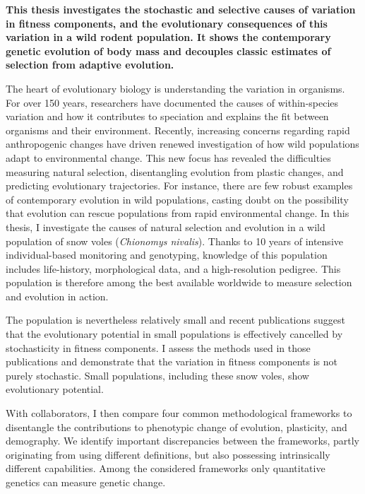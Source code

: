 \begin{summary}
\textbf{
This thesis investigates the stochastic and selective causes of variation in fitness components, and the evolutionary consequences of this variation in a wild rodent population. 
It shows the contemporary genetic evolution of body mass and decouples classic estimates of selection from adaptive evolution. 
}

The heart of evolutionary biology is understanding the variation in organisms. For over 150 years, researchers have documented the causes of within-species variation and how it contributes to speciation and explains the fit between organisms and their environment. 
Recently, increasing concerns regarding rapid anthropogenic changes have driven renewed investigation of how wild populations adapt to environmental change.
This new focus has revealed the difficulties measuring natural selection, disentangling evolution from plastic changes, and predicting evolutionary trajectories. 
For instance, there are few robust examples of contemporary evolution in wild populations, casting doubt on the possibility that evolution can rescue populations from rapid environmental change.
In this thesis, I investigate the causes of natural selection and evolution in a wild population of snow voles (\textit{Chionomys nivalis}). Thanks to 10 years of intensive individual-based monitoring and genotyping, knowledge of this population includes life-history, morphological data, and a high-resolution pedigree. This population is therefore among the best available worldwide to measure selection and evolution in action. 

The population is nevertheless relatively small and recent publications suggest that the evolutionary potential in small populations is effectively cancelled by stochasticity in fitness components. I assess the methods used in those publications and demonstrate that the variation in fitness components is not purely stochastic. Small populations, including these snow voles, show evolutionary potential. 
 
With collaborators, I then compare four common methodological frameworks to disentangle the contributions to phenotypic change of evolution, plasticity, and demography. We identify important discrepancies between the frameworks, partly originating from using different definitions, but also possessing intrinsically different capabilities. Among the considered frameworks only quantitative genetics can measure genetic change.


\end{summary}
